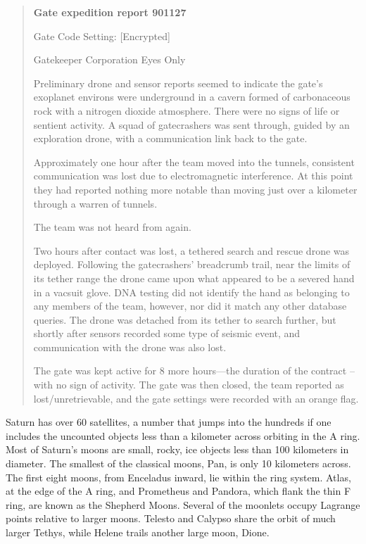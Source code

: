 \begin{quotation}
  \textbf{Gate expedition report 901127}
  
  Gate Code Setting: [Encrypted]
  
  Gatekeeper Corporation Eyes Only

  Preliminary drone and sensor reports seemed to indicate the gate’s
  exoplanet environs were underground in a cavern formed of
  carbonaceous rock with a nitrogen dioxide atmosphere.  There were no
  signs of life or sentient activity. A squad of gatecrashers was sent
  through, guided by an exploration drone, with a communication link
  back to the gate.

  Approximately one hour after the team moved into the tunnels,
  consistent communication was lost due to electromagnetic
  interference. At this point they had reported nothing more notable
  than moving just over a kilometer through a warren of tunnels.

  The team was not heard from again.

  Two hours after contact was lost, a tethered search and rescue drone
  was deployed. Following the gatecrashers’ breadcrumb trail, near the
  limits of its tether range the drone came upon what appeared to be a
  severed hand in a vacsuit glove. DNA testing did not identify the
  hand as belonging to any members of the team, however, nor did it
  match any other database queries.  The drone was detached from its
  tether to search further, but shortly after sensors recorded some
  type of seismic event, and communication with the drone was also
  lost.

  The gate was kept active for 8 more hours—the duration of the
  contract -- with no sign of activity. The gate was then closed, the
  team reported as lost/unretrievable, and the gate settings were
  recorded with an orange flag.
\end{quotation}


Saturn has over 60 satellites, a number that jumps into the hundreds
if one includes the uncounted objects less than a kilometer across
orbiting in the A ring.  Most of Saturn’s moons are small, rocky, ice
objects less than 100 kilometers in diameter. The smallest of the
classical moons, Pan, is only 10 kilometers across.  The first eight
moons, from Enceladus inward, lie within the ring system. Atlas, at
the edge of the A ring, and Prometheus and Pandora, which flank the
thin F ring, are known as the Shepherd Moons.  Several of the moonlets
occupy Lagrange points relative to larger moons. Telesto and Calypso
share the orbit of much larger Tethys, while Helene trails another
large moon, Dione.

